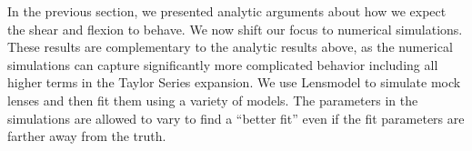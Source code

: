In the previous section, we presented analytic arguments about how we expect the shear and flexion to behave. We now shift our focus to numerical simulations. These results are complementary to the analytic results above, as the numerical simulations can capture significantly more complicated behavior including all higher terms in the Taylor Series expansion. We use Lensmodel \citep{Keeton01} to simulate mock lenses and then fit them using a variety of models. The parameters in the simulations are allowed to vary to find a ``better fit'' even if the fit parameters are farther away from the truth. 